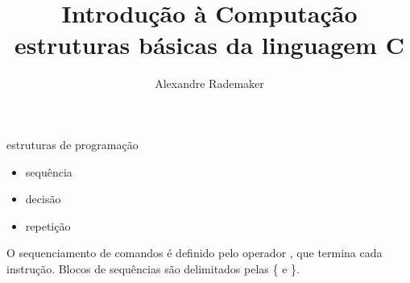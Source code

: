 \documentclass{beamer}
\title{Introdução à Computação \\ estruturas básicas da linguagem C}
\author{Alexandre Rademaker}
\date{}
\begin{document}
\begin{frame}
 \maketitle
\end{frame}


\begin{frame}{estruturas de programação}

  \begin{itemize}
  \item sequência
  \item decisão
  \item repetição
  \end{itemize}

  O sequenciamento de comandos é definido pelo operador \ilcode{;},
  que termina cada instrução. Blocos de sequências são delimitados
  pelas \{ e \}.
  
\end{frame}
\end{document}
